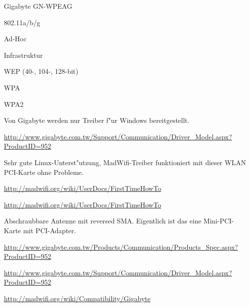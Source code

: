 %
%
\begin{wlandevice}{Gigabyte GN-WPEAG}



\begin{wlanieeestandard}
\item 802.11a/b/g
\end{wlanieeestandard}

\begin{wlanmode}
\item Ad-Hoc
\item Infrastruktur
\end{wlanmode}

\begin{wlansecurity}
\item WEP (40-, 104-, 128-bit)
\item WPA
\item WPA2
\end{wlansecurity}

\begin{wlandriver}
\item
Von Gigabyte werden nur Treiber f"ur Windows bereitgestellt.

\url{http://www.gigabyte.com.tw/Support/Communication/Driver_Model.aspx?ProductID=952}

Sehr gute Linux-Unterst"utzung, MadWifi-Treiber funktioniert
mit dieser WLAN PCI-Karte ohne Probleme.

\url{http://madwifi.org/wiki/UserDocs/FirstTimeHowTo}
\end{wlandriver}


\begin{wlaninstall}
\item \url{http://madwifi.org/wiki/UserDocs/FirstTimeHowTo}
\end{wlaninstall}

\begin{wlanextrainfo}
\item
Abschraubbare Antenne mit reversed SMA.
Eigentlich ist das eine Mini-PCI-Karte mit PCI-Adapter.
\end{wlanextrainfo}

\begin{wlanlink}
\item \url{http://www.gigabyte.com.tw/Products/Communication/Products_Spec.aspx?ProductID=952}
\item \url{http://www.gigabyte.com.tw/Support/Communication/Driver_Model.aspx?ProductID=952}
\item \url{http://madwifi.org/wiki/Compatibility/Gigabyte}
\end{wlanlink}

\end{wlandevice}

